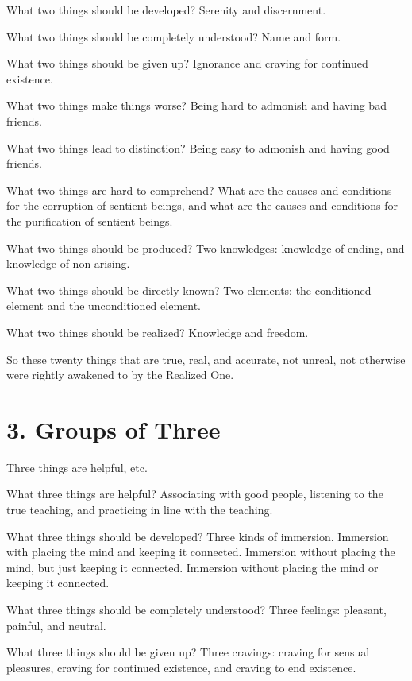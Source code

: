 \documentclass[12pt,openany]{book}%
\begin{document}
What two things should be developed? Serenity and discernment. 

What two things should be completely understood? Name and form. 

What two things should be given up? Ignorance and craving for continued existence. 

What two things make things worse? Being hard to admonish and having bad friends. 

What two things lead to distinction? Being easy to admonish and having good friends. 

What two things are hard to comprehend? What are the causes and conditions for the corruption of sentient beings, and what are the causes and conditions for the purification of sentient beings. 

What two things should be produced? Two knowledges: knowledge of ending, and knowledge of non-arising. 

What two things should be directly known? Two elements: the conditioned element and the unconditioned element. 

What two things should be realized? Knowledge and freedom. 

So these twenty things that are true, real, and accurate, not unreal, not otherwise were rightly awakened to by the Realized One. 

\section*{3. Groups of Three }

Three things are helpful, etc. 

What three things are helpful? Associating with good people, listening to the true teaching, and practicing in line with the teaching. 

What three things should be developed? Three kinds of immersion. Immersion with placing the mind and keeping it connected. Immersion without placing the mind, but just keeping it connected. Immersion without placing the mind or keeping it connected. 

What three things should be completely understood? Three feelings: pleasant, painful, and neutral. 

What three things should be given up? Three cravings: craving for sensual pleasures, craving for continued existence, and craving to end existence. 
\end{document}
